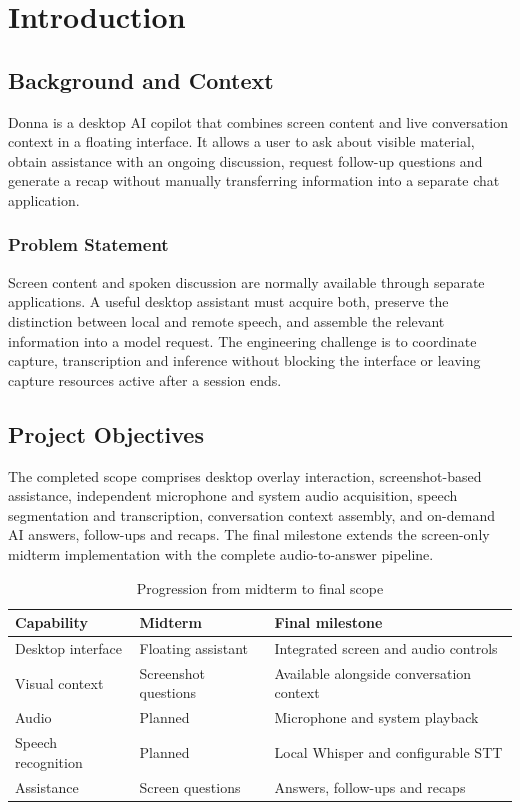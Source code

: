 \documentclass[openany]{tietreport}
\author{%
  \texttt{1024170400} Samyak Jain \\
  \texttt{1024170388} Sangam Sangwan%
}
\begin{document}
\maketitle
\tableofcontents
\chapter{Introduction}
\section{Background and Context}
Donna is a desktop AI copilot that combines screen content and live conversation context in a floating interface. It allows a user to ask about visible material, obtain assistance with an ongoing discussion, request follow-up questions and generate a recap without manually transferring information into a separate chat application.
\subsection{Problem Statement}
Screen content and spoken discussion are normally available through separate applications. A useful desktop assistant must acquire both, preserve the distinction between local and remote speech, and assemble the relevant information into a model request. The engineering challenge is to coordinate capture, transcription and inference without blocking the interface or leaving capture resources active after a session ends.
\section{Project Objectives}
The completed scope comprises desktop overlay interaction, screenshot-based assistance, independent microphone and system audio acquisition, speech segmentation and transcription, conversation context assembly, and on-demand AI answers, follow-ups and recaps. The final milestone extends the screen-only midterm implementation with the complete audio-to-answer pipeline.
\begin{table}[htbp]\centering\small
\begin{tabularx}{\linewidth}{@{}lXX@{}}\toprule
Capability & Midterm & Final milestone \\ \midrule
Desktop interface & Floating assistant & Integrated screen and audio controls \\
Visual context & Screenshot questions & Available alongside conversation context \\
Audio & Planned & Microphone and system playback \\
Speech recognition & Planned & Local Whisper and configurable STT \\
Assistance & Screen questions & Answers, follow-ups and recaps \\
\bottomrule\end{tabularx}\caption{Progression from midterm to final scope}\end{table}
\end{document}
